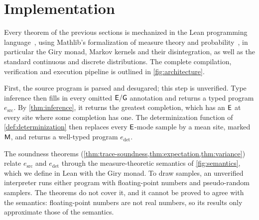 \section{Implementation}
\label{sec:implementation}

Every theorem of the previous sections is mechanized in the Lean programming language~\cite{lean}, using Mathlib's formalization of measure theory and probability~\cite{mathlib}, in particular the Giry monad, Markov kernels and their disintegration, as well as the standard continuous and discrete distributions. The complete compilation, verification and execution pipeline is outlined in \cref{fig:architecture}.



First, the source program is parsed and desugared; this step is unverified. Type inference then fills in every omitted $\mathsf{E}/\mathsf{G}$ annotation and returns a typed program $e_{\mathrm{src}}$. By \cref{thm:inference}, it returns the greatest completion, which has an $\mathsf{E}$ at every site where some completion has one. The determinization function of \cref{def:determinization} then replaces every $\mathsf{E}$-mode sample by a mean site, marked $\mathsf{M}$, and returns a well-typed program $e_{\mathrm{det}}$.

The soundness theorems (\cref{thm:trace-soundness,thm:expectation,thm:variance}) relate $e_{\mathrm{src}}$ and $e_{\mathrm{det}}$ through the measure-theoretic semantics of \cref{fig:semantics}, which we define in Lean with the Giry monad. To draw samples, an unverified interpreter runs either program with floating-point numbers and pseudo-random samplers. The theorems do not cover it, and it cannot be proved to agree with the semantics: floating-point numbers are not real numbers, so its results only approximate those of the semantics.

